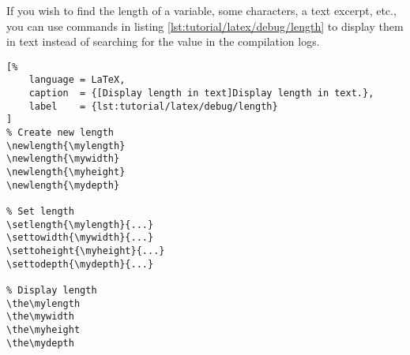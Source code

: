 If you wish to find the length of a \gls{variable}, some characters, a text excerpt, etc., you can use \glspl{command} in listing \ref{lst:tutorial/latex/debug/length} to display them in text instead of searching for the \gls{value} in the compilation logs.
\bigskip

\begin{lstlisting}[%
    language = LaTeX,
    caption  = {[Display length in text]Display length in text.},
    label    = {lst:tutorial/latex/debug/length}
]
% Create new length
\newlength{\mylength}
\newlength{\mywidth}
\newlength{\myheight}
\newlength{\mydepth}

% Set length
\setlength{\mylength}{...}
\settowidth{\mywidth}{...}
\settoheight{\myheight}{...}
\settodepth{\mydepth}{...}

% Display length
\the\mylength
\the\mywidth
\the\myheight
\the\mydepth
\end{lstlisting}